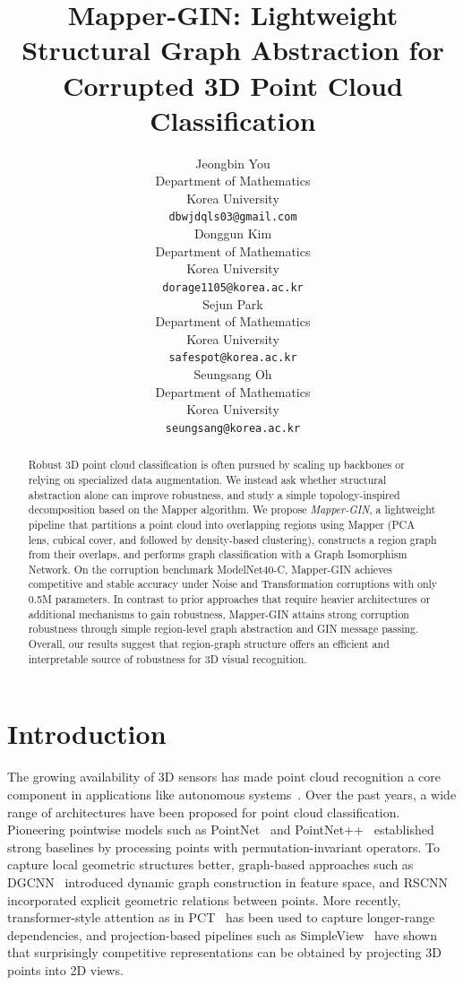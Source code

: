 \documentclass{article}
\title{Mapper-GIN: Lightweight Structural Graph Abstraction for Corrupted 3D Point Cloud Classification}
\author{
  Jeongbin You \\
  Department of Mathematics \\
  Korea University \\
  \texttt{dbwjdqls03@gmail.com} \\
  \And
  Donggun Kim \\
  Department of Mathematics \\
  Korea University \\
  \texttt{dorage1105@korea.ac.kr} \\
  \And
  Sejun Park \\
  Department of Mathematics \\
  Korea University \\
  \texttt{safespot@korea.ac.kr} \\
  \And
  Seungsang Oh \\
  Department of Mathematics \\
  Korea University \\
  \texttt{seungsang@korea.ac.kr} \\
}
\begin{document}
\maketitle
\begin{abstract}
Robust 3D point cloud classification is often pursued by scaling up backbones or relying on specialized data augmentation. We instead ask whether structural abstraction alone can improve robustness, and study a simple topology-inspired decomposition based on the Mapper algorithm. We propose \emph{Mapper-GIN}, a lightweight pipeline that partitions a point cloud into overlapping regions using Mapper (PCA lens, cubical cover, and followed by density-based clustering), constructs a region graph from their overlaps, and performs graph classification with a Graph Isomorphism Network. On the corruption benchmark ModelNet40-C, Mapper-GIN achieves competitive and stable accuracy under Noise and Transformation corruptions with only 0.5M parameters. In contrast to prior approaches that require heavier architectures or additional mechanisms to gain robustness, Mapper-GIN attains strong corruption robustness through simple region-level graph abstraction and GIN message passing. Overall, our results suggest that region-graph structure offers an efficient and interpretable source of robustness for 3D visual recognition.
\end{abstract}


\section{Introduction}

The growing availability of 3D sensors has made point cloud recognition a core component in applications like autonomous systems~\cite{7583659, Kidono2011PedestrianRU}. Over the past years, a wide range of architectures have been proposed for point cloud classification. Pioneering pointwise models such as PointNet~\cite{pointnet2017} and PointNet++~\cite{qi2017pointnetplusplus} established strong baselines by processing points with permutation-invariant operators. To capture local geometric structures better, graph-based approaches such as DGCNN~\cite{dynamicgcnn2019} introduced dynamic graph construction in feature space, and RSCNN~\cite{liu2019rscnn} incorporated explicit geometric relations between points. More recently, transformer-style attention as in PCT~\cite{guo2021pct} has been used to capture longer-range dependencies, and projection-based pipelines such as SimpleView~\cite{goyal2021revisiting} have shown that surprisingly competitive representations can be obtained by projecting 3D points into 2D views.
\end{document}
